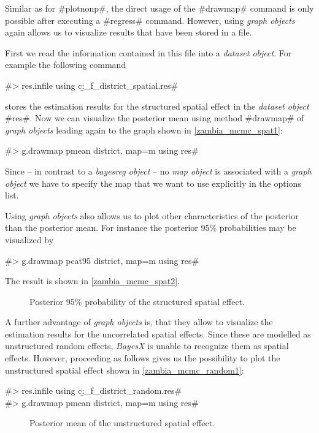 Similar as for #plotnonp#, the direct usage of the #drawmap#
command is only possible after executing a #regress# command.
However, using {\it graph objects} again allows us to visualize
results that have been stored in a file.

First we read the information contained in this file into a {\it
dataset object}. For example the following command

#> res.infile using c:\data\b_f_district_spatial.res#

stores the estimation results for the structured spatial effect in
the {\em dataset object} #res#. Now we can visualize the posterior
mean using method #drawmap# of {\it graph objects} leading again
to the graph shown in \autoref{zambia_mcmc_spat1}:

#> g.drawmap pmean district, map=m using res#

Since -- in contrast to a {\it bayesreg object} -- no {\it map
object} is associated with a {\it graph object} we have to specify
the map that we want to use explicitly in the options list.

Using {\it graph objects} also allows us to plot other
characteristics of the posterior than the posterior mean. For
instance the posterior 95\% probabilities may be visualized by

#> g.drawmap pcat95 district, map=m using res#

The result is shown in \autoref{zambia_mcmc_spat2}.

\begin{figure}[ht]
\begin{center}
{\it\caption{Posterior 95\% probability of the structured spatial
effect.\label{zambia_mcmc_spat2}}}
\end{center}
\end{figure}

A further advantage of {\it graph objects} is, that they allow to
visualize the estimation results for the uncorrelated spatial
effects. Since these are modelled as unstructured random effects,
{\it BayesX} is unable to recognize them as spatial effects.
However, proceeding as follows gives us the possibility to plot
the unstructured spatial effect shown in
\autoref{zambia_mcmc_random1}:

#> res.infile using c:\data\b_f_district_random.res#\\
#> g.drawmap pmean district, map=m using res#

\begin{figure}[ht]
\begin{center}
{\it\caption{Posterior mean of the unstructured spatial
effect.\label{zambia_mcmc_random1}}}
\end{center}
\end{figure}

